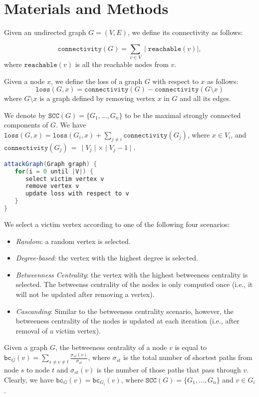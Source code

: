 \section{Materials and Methods}
Given an undirected graph $G=(V,E)$, we define its connectivity as follows:

$$
\mathtt{connectivity}(G) = \sum_{v \in V} \mid \mathtt{reachable}(v) \mid,
$$ where $\mathtt{reachable}(v)$ is all the reachable nodes from $v$.

Given a node $x$, we define the loss of a graph $G$ with respect to $x$ as follows:
$$
\mathtt{loss}(G, x) = \mathtt{connectivity}(G) - \mathtt{connectivity}(G \setminus x)
$$
where $G \setminus x$ is a graph defined by removing vertex $x$ in $G$ and all its edges. 

We denote by $\mathtt{SCC}(G) = \{G_1, \ldots, G_n\}$ to be the maximal strongly connected components of $G$. 
We have $\mathtt{loss}(G, x) = \mathtt{loss}(G_i,x) + \sum_{j \neq i} \mathtt{connectivity}(G_j)$, where $x \in V_i$, and  $\mathtt{connectivity}(G_j) \,=\, \mid V_j \mid \times \mid V_j  - 1\mid$.

\begin{lstlisting}[language=java]
attackGraph(Graph graph) {
   for(i = 0 until |V|) {
      select victim vertex v
      remove vertex v
      update loss with respect to v
   }
}
\end{lstlisting}

We select a victim vertex according to one of the following four scenarios: 
\begin{itemize}
\item \emph{Random}: a random vertex is selected.
\item \emph{Degree-based}: the vertex with the highest degree is selected. 
\item \emph{Betweenness Centrality}: the vertex with the highest betweeness centrality is selected. The betweenss centrality of the nodes is only computed once (i.e., it will not be updated after removing a vertex). 
\item \emph{Cascanding}: Similar to the betweeness centrality scenario, however, the betweeness centrality of the nodes is updated at each iteration (i.e., after removal of a victim vertex).
\end{itemize}

Given a graph $G$, the betweeness centrality of a node $v$ is equal to $\mathtt{bc}_G(v) = \sum_{s \neq v \neq t} \frac{\sigma_{st}(v)}{\sigma_{st}}$, where  
$\sigma_{st}$ is the total number of shortest paths from node 
$s$ to node $t$ and $\sigma_{st}(v)$ is the number of those paths that pass through $v$. Clearly, we have 
$\mathtt{bc}_G(v) = \mathtt{bc}_{G_i}(v)$, where $\mathtt{SCC}(G) = \{G_1, \ldots, G_n\}$  and $v \in G_i$. 


